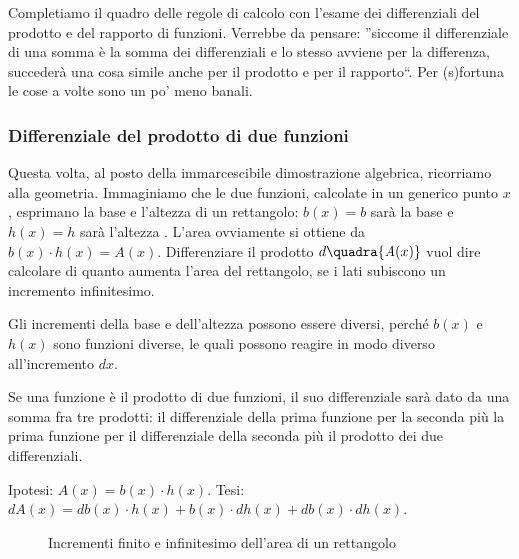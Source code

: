 Completiamo il quadro delle regole di calcolo con l'esame dei differenziali
del prodotto e del rapporto di funzioni. Verrebbe da pensare: ''siccome il 
differenziale di una somma è la somma dei differenziali e lo stesso avviene
per la differenza, succederà una cosa simile anche per il prodotto e per il 
rapporto``. 
Per (s)fortuna le cose a volte sono un po' meno banali.

\subsubsection{Differenziale del prodotto di due funzioni}
\label{}
Questa volta, al posto della immarcescibile dimostrazione algebrica, 
ricorriamo
alla geometria. Immaginiamo che le due funzioni, calcolate in un generico 
punto $x$,
esprimano la base e l'altezza di un rettangolo:
$b(x)=b$ sarà la base  e $h(x)=h$ sarà l'altezza . L'area ovviamente
si ottiene da $b(x)\cdot h(x)=\mathit{A}(x)$. 
Differenziare il prodotto $d\quadra{\mathit{A}(x)}$ vuol dire calcolare di
quanto aumenta l'area del rettangolo, se i lati subiscono un incremento 
infinitesimo. 

\begin{osservazione}
Gli incrementi della base e dell'altezza possono essere 
diversi, perché $b(x)$ e $h(x)$ sono funzioni diverse, le quali possono
reagire in modo diverso all'incremento $dx$.
\end{osservazione}

\begin{teorema}
 Se una funzione è il prodotto di due funzioni, il suo  differenziale 
 sarà dato da una somma fra tre prodotti: il differenziale della
 prima funzione per la seconda più la prima funzione per il differenziale 
 della seconda più il prodotto dei due differenziali.
\end{teorema}
\noindent Ipotesi: $\mathit{A}(x)=b(x)\cdot h(x)$.\qquad 
Tesi: $d\mathit{A}(x)=db(x)\cdot h(x)+b(x)\cdot dh(x)+ db(x)\cdot dh(x)$.

\begin{figure}[h]
\begin{inaccessibleblock}
 \begin{center}
 \begin{minipage}[]{.38 \textwidth}
  \vspace{27mm} \incrementaleprodotto
 \end{minipage} 
 \hfill
 \begin{minipage}[]{.58 \textwidth}
  \differenzialeprodotto
 \end{minipage}
 \end{center}
\end{inaccessibleblock}
\caption{Incrementi finito e infinitesimo dell'area di un rettangolo} 
\label{fig:Incre_prodotto}
\end{figure}


